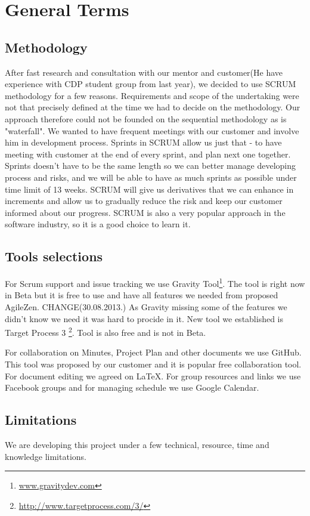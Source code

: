 \documentclass{report}
\begin{document}
\section{General Terms}
\subsection{Methodology}
After fast research and consultation with our mentor and customer(He have experience with CDP student group from last year), we decided to use SCRUM methodology for a 
few reasons. Requirements and scope of the undertaking were not that precisely defined at the time 
we had to decide on the methodology. Our approach therefore could not be founded on the sequential methodology as is "waterfall".
We wanted to have frequent meetings with our customer and involve him in development process. Sprints in SCRUM allow us just that - 
to have meeting with customer at the end of every sprint, and plan next one together. Sprints doesn't have to be the same length so 
we can better manage developing process and risks, and we will be able to have as much sprints as possible under time limit of 13 weeks. 
SCRUM will give us derivatives that we can enhance in increments and allow us to gradually reduce the risk and keep our customer informed 
about our progress. SCRUM is also a very popular approach in the software industry, so it is a good choice to learn it. 


\subsection{Tools selections}
For Scrum support and issue tracking we use Gravity Tool\footnote{\url{www.gravitydev.com}}. 
The tool is right now in Beta but it is free to use and have all features we needed from proposed AgileZen.
CHANGE(30.08.2013.) As Gravity missing some of the features we didn't know we need it was hard to procide in it.
New tool we established is Target Process 3 \footnote{\url{http://www.targetprocess.com/3/}}. Tool is also free and is not in Beta.

For collaboration on Minutes, Project Plan and other documents we use GitHub. This tool was proposed by our customer and it is popular free collaboration tool.
For document editing we agreed on LaTeX.
For group resources and links we use Facebook groups and for managing schedule we use Google Calendar.
 
\subsection{Limitations}
We are developing this project under a few technical, resource, time and knowledge limitations. 
\end{document}
